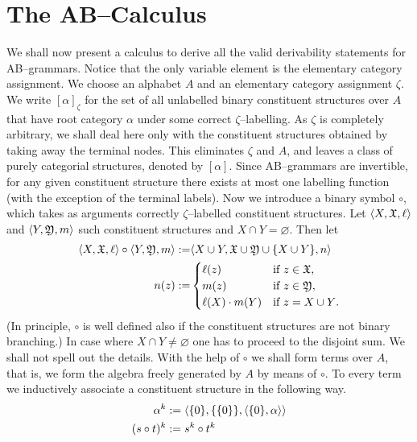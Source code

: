\section{The AB--Calculus}
\label{kap3-3}
%
%
%
We shall now present a calculus to derive all the valid
derivability statements for AB--grammars. 
Notice that the only variable element is the elementary category 
assignment. We choose an alphabet $A$ and an elementary category 
assignment $\zeta$. We write 
\index{$[\alpha]_{\zeta}$, $[\alpha]$}%
$[\alpha]_{\zeta}$ for the set of all
unlabelled binary constituent structures over $A$ that have
root category $\alpha$ under some correct $\zeta$--labelling.
As $\zeta$ is completely arbitrary, we shall deal here only 
with the constituent structures obtained by taking away the 
terminal nodes. This eliminates $\zeta$ and $A$, and leaves a class of
purely categorial structures, denoted by $[\alpha]$. Since 
AB--grammars are invertible, for any given constituent structure 
there exists at most one labelling function (with the exception of 
the terminal labels). Now we introduce a binary symbol $\circ$, 
\index{$\circ$}%
which takes as arguments correctly
$\zeta$--labelled constituent structures. Let $\langle X, \mathfrak{X}, \ell\rangle$
and $\langle Y, \mathfrak{Y},m\rangle$ such constituent structures
and $X \cap Y = \varnothing$. Then let
\begin{align}
\langle X, \mathfrak{X},\ell\rangle \circ \langle Y, \mathfrak{Y},m\rangle := &
        \langle X \cup Y, \mathfrak{X} \cup \mathfrak{Y} \cup \{X \cup Y\},n\rangle \\
n(z) := & \begin{cases}
\ell(z) & \text{if $z \in \mathfrak{X}$}, \\
m(z) & \text{if $z \in \mathfrak{Y}$}, \\
\ell(X) \cdot m(Y) & \text{if $z = X \cup Y$.}
\end{cases}
\end{align}
(In principle, $\circ$ is well defined also if the constituent
structures are not binary branching.) In case where
$X \cap Y \neq \varnothing$ one has to proceed to the disjoint
sum. We shall not spell out the details. With the help of
$\circ$ we shall form terms over $A$, that is, we form the
algebra freely generated by $A$ by means of $\circ$.
To every term we inductively associate a constituent
structure in the following way.
\begin{subequations}
\begin{align}
\alpha^k & := \langle \{0\}, \{\{0\}\}, \langle \{0\}, \alpha\rangle\rangle \\
(s \circ t)^k & := s^k \circ t^k
\end{align}
\end{subequations}
